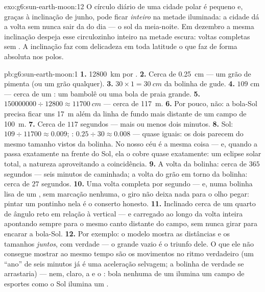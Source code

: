 \begin{solution}{exo:g6:sun-earth-moon:12}
O círculo diário de uma cidade polar é pequeno e, graças à
inclinação de junho, pode ficar \emph{inteiro} na metade iluminada: a
cidade dá a volta sem nunca sair da  do dia --- o sol da
meia-noite. Em dezembro a mesma inclinação despeja esse circulozinho
inteiro na metade escura: voltas completas sem . A
inclinação faz com delicadeza em toda latitude o que faz de forma
absoluta nos polos.
\end{solution}

\begin{solution}{pb:g6:sun-earth-moon:1}
\textbf{1.} \qty{12800}{km} por .
\textbf{2.} Cerca de \qty{0.25}{cm} --- um grão de pimenta (ou um
grão qualquer).
\textbf{3.} $30 \times 1 = \qty{30}{cm}$ da bolinha de gude.
\textbf{4.} $109$ cm --- cerca de um : um bambolê ou uma bola de
praia grande.
\textbf{5.} $150000000 \div 12800 \approx \qty{11700}{cm}$ --- cerca
de \qty{117}{m}.
\textbf{6.} Por pouco, não: a bola-Sol precisa ficar uns \qty{17}{m}
além da linha de fundo mais distante de um campo de \qty{100}{m}.
\textbf{7.} Cerca de $117$ segundos --- mais ou menos dois minutos.
\textbf{8.} Sol: $109 \div 11700 \approx 0.009$; :
$0.25 \div 30 \approx 0.008$ --- quase iguais: os dois parecem do
mesmo tamanho vistos da bolinha. No nosso céu é a mesma coisa --- e,
quando a  passa exatamente na frente do Sol, ela o cobre quase
exatamente: um eclipse solar total, a natureza aproveitando a
coincidência.
\textbf{9.} A volta da bolinha: cerca de $365$ segundos --- seis
minutos de caminhada; a volta do grão em torno da bolinha: cerca de
$27$ segundos.
\textbf{10.} Uma volta completa por segundo --- e, numa bolinha lisa
de um , sem marcação nenhuma, o giro não deixa nada para o
olho pegar: pintar um pontinho nela é o conserto honesto.
\textbf{11.} Inclinado cerca de um quarto de ângulo reto em relação à
vertical --- e carregado ao longo da volta inteira apontando sempre
para o mesmo canto distante do campo, sem nunca girar para encarar a
bola-Sol.
\textbf{12.} Por exemplo: o modelo mostra as distâncias e os tamanhos
\emph{juntos}, com verdade --- o grande vazio é o triunfo dele. O que
ele não consegue mostrar ao mesmo tempo são os movimentos no ritmo
verdadeiro (um ``ano'' de seis minutos já é uma aceleração selvagem;
a bolinha de verdade se arrastaria) --- nem, claro, a  e o :
bola nenhuma de um  ilumina um campo de esportes como o Sol
ilumina um .
\end{solution}
